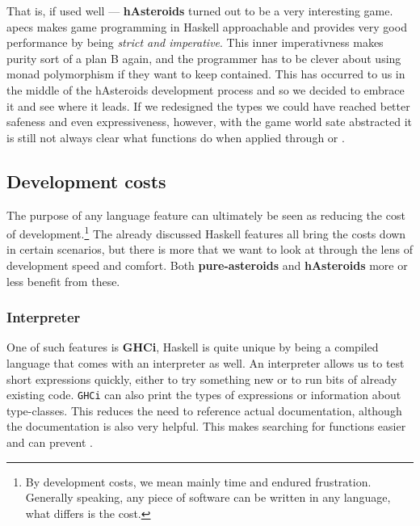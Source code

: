 \documentclass[
  digital, %
  color,   %
  table,   %
  oneside, %
  lof,     %
  lot,     %
]{fithesis3}
\begin{document}
{That is, if used well --- \textbf{hAsteroids} turned out to be a very interesting game.
apecs makes game programming in Haskell approachable and provides
very good performance by being \emph{strict and imperative}. This inner imperativness
makes purity sort of a plan B again, and the programmer has to be clever about using monad polymorphism
if they want to keep  contained. This has occurred to us in the middle
of the hAsteroids development process and so we decided to embrace it and see where it leads.
If we redesigned the types we could have reached better safeness and even expressiveness, however,
with the game world sate abstracted it is still not always clear what functions do
when applied through  or .



\subsection{Development costs}

The purpose of any language feature can ultimately be seen as reducing the cost of development.\footnote{
By development costs, we mean mainly time and endured frustration. Generally speaking,
any piece of software can be written in any language, what differs is the cost.
}
The already discussed Haskell features all bring the costs down in certain scenarios, but there is more
that we want to look at through the lens of development speed and comfort.
Both \textbf{pure-asteroids} and \textbf{hAsteroids} more or less benefit from these.

\subsubsection{Interpreter}
One of such features is \textbf{GHCi}, \cite{ghciwiki}
Haskell is quite unique by being a compiled language that comes with an interpreter as well.
An interpreter allows us to test short expressions quickly, either to try something new or to
run bits of already existing code. \texttt{GHCi} can also print the types of expressions
or information about type-classes. This reduces the need to reference actual documentation,
although the documentation is also very helpful. \cite{hoogle} This makes searching for functions easier
and can prevent .

}
\end{document}
